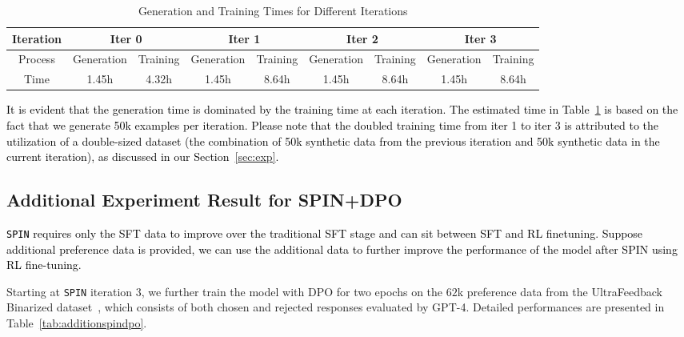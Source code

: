 \documentclass{article}
\newcommand{\method}{\texttt{SPIN}}
\def\CC{\textcolor{black}}
\begin{document}
\begin{table}[h!]
    \caption{Generation and Training Times for Different Iterations}
    \centering
    \begin{tabular}{c|cc|cc|cc|cc}
       \toprule
       Iteration & \multicolumn{2}{c|}{Iter 0} & \multicolumn{2}{c|}{Iter 1} & \multicolumn{2}{c|}{Iter 2} & \multicolumn{2}{c}{Iter 3} \\ \midrule
          Process& Generation  & Training  & Generation  & Training  & Generation  & Training  & Generation  & Training  \\  \midrule
        Time  & 1.45h & 4.32h & 1.45h & 8.64h & 1.45h & 8.64h & 1.45h & 8.64h \\     \bottomrule
    \end{tabular}
    \label{tab:times}
\end{table}

\CC{It is evident that the generation time is dominated by the training time at each iteration. The estimated time in Table~\ref{tab:times} is based on the fact that we generate 50k examples per iteration. Please note that the doubled training time from iter 1 to iter 3 is attributed to the utilization of a double-sized dataset (the combination of 50k synthetic data from the previous iteration and 50k synthetic data in the current iteration), as discussed in our Section~\ref{sec:exp}.}



\subsection{Additional Experiment Result for SPIN+DPO} 
\CC{\method{} requires only the SFT data to improve over the traditional SFT stage and can sit between SFT and RL finetuning. Suppose additional preference data is provided, we can use the additional data to further improve the performance of the model after SPIN using RL fine-tuning. }

Starting at \method{} iteration 3, we further train the model with DPO for two epochs on the $62$k preference data from the UltraFeedback Binarized dataset~\citep{cui2023ultrafeedback}, which consists of both chosen and rejected responses evaluated by GPT-4. Detailed performances are presented in Table~\ref{tab:additionspindpo}.
\end{document}
